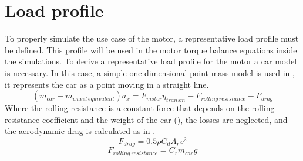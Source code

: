 \section{Load profile}
\label{section:03load_profile}
\vfill

To properly simulate the use case of the motor, a representative load profile must be defined. This profile will be used in the motor torque balance equations inside the simulations. To derive a representative load profile for the motor a car model is necessary. In this case, a simple one-dimensional point mass model is used in , it represents the car as a point moving in a straight line.
\begin{equation}
	\left(m_{car}+m_{wheel\,equivalent}\right)a_x = F_{motor}\eta_{transm}-F_{rolling\,resistance}-F_{drag}
	\label{eq:load_prof_initial}
\end{equation}
Where the rolling resistance is a constant force that depends on the rolling resistance coefficient and the weight of the car (), the losses are neglected, and the aerodynamic drag is calculated as in .
\begin{equation}
	F_{drag} = 0.5\rho C_{d} A_{r} v^2
	\label{eq:drag_force}
\end{equation}
\begin{equation}
	F_{rolling\,resistance} = C_{r} m_{car} g
	\label{eq:rolling_resistance}
\end{equation}

